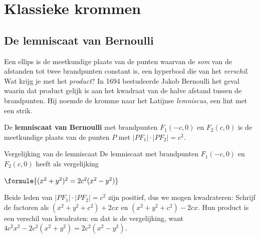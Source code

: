 \begin{oefeningen}
\end{oefeningen}

\section{Klassieke krommen}

\subsection{De lemniscaat van Bernoulli}

Een ellips is de meetkundige plaats van de punten waarvan de \textit{som} van de afstanden tot twee brandpunten constant is, een hyperbool die van het \textit{verschil}. Wat krijg je met het \textit{product}? In 1694 bestudeerde Jakob Bernoulli het geval waarin dat product gelijk is aan het kwadraat van de halve afstand tussen de brandpunten. Hij noemde de kromme naar het Latijnse \textit{lemniscus}, een lint met een strik.

\begin{theorie}
De \textbf{\textcolor{accent}{lemniscaat van Bernoulli}} met brandpunten $F_1(-c, 0)$ en $F_2(c, 0)$ is de meetkundige plaats van de punten $P$ met $|PF_1| \cdot |PF_2| = c^2$.

\begin{stelling}{Vergelijking van de lemniscaat}
De lemniscaat met brandpunten $F_1(-c, 0)$ en $F_2(c, 0)$ heeft als vergelijking

\vspace{1mm}
\qquad $\formule{(x^2 + y^2)^2 = 2c^2(x^2 - y^2)}$
\end{stelling}

\begin{bewijs}
Beide leden van $|PF_1| \cdot |PF_2| = c^2$ zijn positief, dus we mogen kwadrateren:
Schrijf de factoren als $(x^2 + y^2 + c^2) + 2cx$ en $(x^2 + y^2 + c^2) - 2cx$. Hun product is een verschil van kwadraten:
en dat is de vergelijking, want $4c^2x^2 - 2c^2(x^2 + y^2) = 2c^2(x^2 - y^2)$.
\end{bewijs}
\end{theorie}

